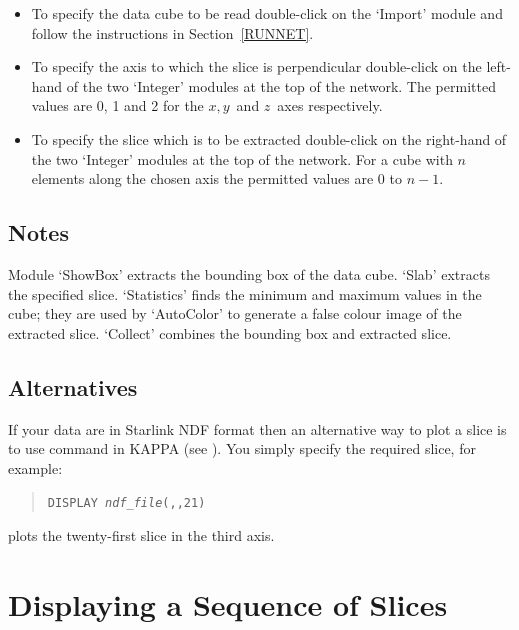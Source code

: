\documentclass[twoside,11pt]{starlink}
\begin{document}
\begin{itemize}

  \item To specify the data cube to be read double-click on the `Import'
   module and follow the instructions in Section~\ref{RUNNET}.

  \item To specify the axis to which the slice is perpendicular
   double-click on the left-hand of the two `Integer' modules at the
   top of the network. The permitted values are 0, 1 and 2 for the
   $x, y$\, and  $z$\, axes respectively.

  \item To specify the slice which is to be extracted double-click on
   the right-hand of the two `Integer' modules at the top of the
   network. For a cube with $n$\, elements along the chosen axis the
   permitted values are 0 to $n-1$.

\end{itemize}

\subsection{Notes}

Module `ShowBox' extracts the bounding box of the data cube. `Slab'
extracts the specified slice. `Statistics' finds the minimum and
maximum values in the cube; they are used by `AutoColor' to generate
a false colour image of the extracted slice. `Collect' combines the
bounding box and extracted slice.

\subsection{Alternatives}

If your data are in Starlink NDF format then an alternative way to
plot a slice is to use command  in KAPPA
(see \cite{SUN95}).  You simply specify the required
slice, for example:

\begin{quote}
\texttt{DISPLAY~\textit{ndf\_file}(,,21)}
\end{quote}

plots the twenty-first slice in the third axis.

\newpage
\section{Displaying a Sequence of Slices}
\end{document}
